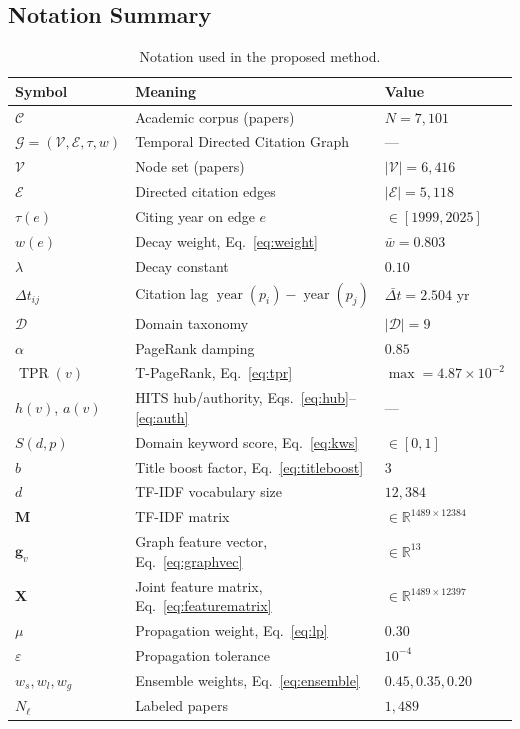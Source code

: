 \documentclass[letterpaper]{article}
\theoremstyle{plain}
\theoremstyle{definition}
\theoremstyle{remark}
\newcommand{\G}{\mathcal{G}}
\newcommand{\V}{\mathcal{V}}
\newcommand{\E}{\mathcal{E}}
\newcommand{\D}{\mathcal{D}}
\newcommand{\C}{\mathcal{C}}
\newcommand{\X}{\mathbf{X}}
\newcommand{\M}{\mathbf{M}}
\newcommand{\R}{\mathbb{R}}
\newcommand{\lam}{\lambda}
\newcommand{\yd}[1]{\operatorname{year}(#1)}
\newcommand{\dt}{\Delta t}
\newcommand{\tpr}[1]{\operatorname{TPR}(#1)}
\newcommand{\hub}[1]{h(#1)}
\newcommand{\auth}[1]{a(#1)}
\begin{document}
\subsection{Notation Summary}

\begin{table}[h]
\centering
\caption{Notation used in the proposed method.}
\label{tab:notation}
\small
\setlength{\tabcolsep}{5pt}
\begin{tabular}{@{}lll@{}}
\toprule
\textbf{Symbol} & \textbf{Meaning} & \textbf{Value} \\
\midrule
$\C$ & Academic corpus (papers) & $N=7{,}101$ \\
$\G=(\V,\E,\tau,w)$ & Temporal Directed Citation Graph & --- \\
$\V$ & Node set (papers) & $|\V|=6{,}416$ \\
$\E$ & Directed citation edges & $|\E|=5{,}118$ \\
$\tau(e)$ & Citing year on edge $e$ & $\in[1999,2025]$ \\
$w(e)$ & Decay weight, Eq.~\eqref{eq:weight} & $\bar{w}=0.803$ \\
$\lam$ & Decay constant & $0.10$ \\
$\dt_{ij}$ & Citation lag $\yd{p_i}-\yd{p_j}$ & $\bar{\dt}=2.504$ yr \\
$\D$ & Domain taxonomy & $|\D|=9$ \\
$\alpha$ & PageRank damping & $0.85$ \\
$\tpr{v}$ & T-PageRank, Eq.~\eqref{eq:tpr} & $\max=4.87\times10^{-2}$ \\
$\hub{v}$, $\auth{v}$ & HITS hub/authority, Eqs.~\eqref{eq:hub}--\eqref{eq:auth} & --- \\
$S(d,p)$ & Domain keyword score, Eq.~\eqref{eq:kws} & $\in[0,1]$ \\
$b$ & Title boost factor, Eq.~\eqref{eq:titleboost} & $3$ \\
$d$ & TF-IDF vocabulary size & $12{,}384$ \\
$\M$ & TF-IDF matrix & $\in\R^{1489\times12384}$ \\
$\mathbf{g}_v$ & Graph feature vector, Eq.~\eqref{eq:graphvec} & $\in\R^{13}$ \\
$\X$ & Joint feature matrix, Eq.~\eqref{eq:featurematrix} & $\in\R^{1489\times12397}$ \\
$\mu$ & Propagation weight, Eq.~\eqref{eq:lp} & $0.30$ \\
$\varepsilon$ & Propagation tolerance & $10^{-4}$ \\
$w_s, w_l, w_g$ & Ensemble weights, Eq.~\eqref{eq:ensemble} & $0.45,0.35,0.20$ \\
$N_\ell$ & Labeled papers & $1{,}489$ \\
\bottomrule
\end{tabular}
\end{table}
\end{document}
